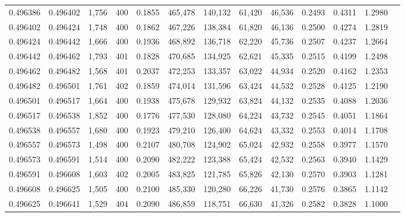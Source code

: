 \begin{tabular}{rrrrrrrrrrrrr}
0.496386 & 0.496402 & 1,756 & 400 &                                     0.1855 & 465,478 & 140,132 &  61,420 &  46,536 & 0.2493 & 0.4311 & 1.2980 \\
0.496402 & 0.496424 & 1,748 & 400 &                                     0.1862 & 467,226 & 138,384 &  61,820 &  46,136 & 0.2500 & 0.4274 & 1.2819 \\
0.496424 & 0.496442 & 1,666 & 400 &                                     0.1936 & 468,892 & 136,718 &  62,220 &  45,736 & 0.2507 & 0.4237 & 1.2664 \\
0.496442 & 0.496462 & 1,793 & 401 &                                     0.1828 & 470,685 & 134,925 &  62,621 &  45,335 & 0.2515 & 0.4199 & 1.2498 \\
0.496462 & 0.496482 & 1,568 & 401 &                                     0.2037 & 472,253 & 133,357 &  63,022 &  44,934 & 0.2520 & 0.4162 & 1.2353 \\
0.496482 & 0.496501 & 1,761 & 402 &                                     0.1859 & 474,014 & 131,596 &  63,424 &  44,532 & 0.2528 & 0.4125 & 1.2190 \\
0.496501 & 0.496517 & 1,664 & 400 &                                     0.1938 & 475,678 & 129,932 &  63,824 &  44,132 & 0.2535 & 0.4088 & 1.2036 \\
0.496517 & 0.496538 & 1,852 & 400 &                                     0.1776 & 477,530 & 128,080 &  64,224 &  43,732 & 0.2545 & 0.4051 & 1.1864 \\
0.496538 & 0.496557 & 1,680 & 400 &                                     0.1923 & 479,210 & 126,400 &  64,624 &  43,332 & 0.2553 & 0.4014 & 1.1708 \\
0.496557 & 0.496573 & 1,498 & 400 &                                     0.2107 & 480,708 & 124,902 &  65,024 &  42,932 & 0.2558 & 0.3977 & 1.1570 \\
0.496573 & 0.496591 & 1,514 & 400 &                                     0.2090 & 482,222 & 123,388 &  65,424 &  42,532 & 0.2563 & 0.3940 & 1.1429 \\
0.496591 & 0.496608 & 1,603 & 402 &                                     0.2005 & 483,825 & 121,785 &  65,826 &  42,130 & 0.2570 & 0.3903 & 1.1281 \\
0.496608 & 0.496625 & 1,505 & 400 &                                     0.2100 & 485,330 & 120,280 &  66,226 &  41,730 & 0.2576 & 0.3865 & 1.1142 \\
0.496625 & 0.496641 & 1,529 & 404 &                                     0.2090 & 486,859 & 118,751 &  66,630 &  41,326 & 0.2582 & 0.3828 & 1.1000 \\

\end{tabular}
